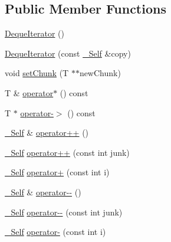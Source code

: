 \subsection*{Public Member Functions}
\begin{DoxyCompactItemize}
\item 
\hyperlink{classprism_1_1containers_1_1_deque_iterator_a79ae1f83d2fae60eae9fde5f51f4830d}{Deque\+Iterator} ()
\item 
\hyperlink{classprism_1_1containers_1_1_deque_iterator_a53d65b1b05a00c68b9b4c37abf7b5974}{Deque\+Iterator} (const \hyperlink{classprism_1_1containers_1_1_deque_iterator_ad27f6d3d6d64495652855cd194f624fc}{\+\_\+\+Self} \&copy)
\item 
void \hyperlink{classprism_1_1containers_1_1_deque_iterator_a453d1c796a47bc7a58fee6763266c077}{set\+Chunk} (T $\ast$$\ast$new\+Chunk)
\item 
T \& \hyperlink{classprism_1_1containers_1_1_deque_iterator_a9a87c5f2723352455db43fbf383b1318}{operator$\ast$} () const 
\item 
T $\ast$ \hyperlink{classprism_1_1containers_1_1_deque_iterator_a1badb21e3e1a355ba95d1095042fd746}{operator-\/$>$} () const 
\item 
\hyperlink{classprism_1_1containers_1_1_deque_iterator_ad27f6d3d6d64495652855cd194f624fc}{\+\_\+\+Self} \& \hyperlink{classprism_1_1containers_1_1_deque_iterator_a4c0ad238fa13814960f334f38808b7be}{operator++} ()
\item 
\hyperlink{classprism_1_1containers_1_1_deque_iterator_ad27f6d3d6d64495652855cd194f624fc}{\+\_\+\+Self} \hyperlink{classprism_1_1containers_1_1_deque_iterator_a6c8cef00860a7792e9431fcd99c19585}{operator++} (const int junk)
\item 
\hyperlink{classprism_1_1containers_1_1_deque_iterator_ad27f6d3d6d64495652855cd194f624fc}{\+\_\+\+Self} \hyperlink{classprism_1_1containers_1_1_deque_iterator_a472e9dcc8c2147671c0f99ec0577d7cc}{operator+} (const int i)
\item 
\hyperlink{classprism_1_1containers_1_1_deque_iterator_ad27f6d3d6d64495652855cd194f624fc}{\+\_\+\+Self} \& \hyperlink{classprism_1_1containers_1_1_deque_iterator_a94169129adc47db90de14758a32993f3}{operator-\/-\/} ()
\item 
\hyperlink{classprism_1_1containers_1_1_deque_iterator_ad27f6d3d6d64495652855cd194f624fc}{\+\_\+\+Self} \hyperlink{classprism_1_1containers_1_1_deque_iterator_a52832d2423bd714ee323e2cebc9ad51f}{operator-\/-\/} (const int junk)
\item 
\hyperlink{classprism_1_1containers_1_1_deque_iterator_ad27f6d3d6d64495652855cd194f624fc}{\+\_\+\+Self} \hyperlink{classprism_1_1containers_1_1_deque_iterator_a4d6669874e4ac73c4fcb57e420507ceb}{operator-\/} (const int i)
$$
\end{DoxyCompactItemize}
